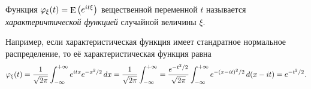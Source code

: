 \begin{to_def}
    Функция $\varphi_\xi (t) = \mathop{\mathrm{E}}\nolimits \left(
        e^{i t \xi}
    \right)$ вещественной переменной $t$ называется \textit{характеричтической функцией} случайной величины $\xi$.
\end{to_def}

Например, если характеристическая функция имеет стандратное нормальное распределение, то её характеристическая функция равна
\begin{equation*}
    \varphi_\xi (t) = \frac{1}{\sqrt{2\pi}} \int_{-\infty}^{+\infty} e^{i t x} e^{- x^2/2} \, d x = 
    \frac{1}{\sqrt{2 \pi}} \int_{-\infty}^{+\infty} =
    \frac{e^{-t^2/2}}{\sqrt{2 \pi}} \int_{-\infty}^{+\infty} e^{- (x-it)^2/2} \, d (x-it) = e^{-t^2/2}.
\end{equation*}
